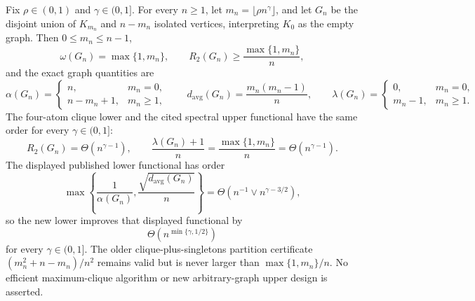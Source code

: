 Fix \(\rho\in(0,1)\) and \(\gamma\in(0,1]\).  For every \(n\geq1\), let \(m_n=\lfloor\rho n^{\gamma}\rfloor\), and let \(G_n\) be the disjoint union of \(K_{m_n}\) and \(n-m_n\) isolated vertices, interpreting \(K_0\) as the empty graph.  Then \(0\leq m_n\leq n-1\),
\[
\omega(G_n)=\max\{1,m_n\},
\qquad
R_2(G_n)\geq\frac{\max\{1,m_n\}}n,
\]
and the exact graph quantities are
\[
\alpha(G_n)=
\begin{cases}
n,&m_n=0,\\
n-m_n+1,&m_n\geq1,
\end{cases}
\qquad
d_{\mathrm{avg}}(G_n)=\frac{m_n(m_n-1)}n,
\qquad
\lambda(G_n)=
\begin{cases}
0,&m_n=0,\\
m_n-1,&m_n\geq1.
\end{cases}
\]
The four-atom clique lower and the cited spectral upper functional have the same order for every \(\gamma\in(0,1]\):
\[
R_2(G_n)=\Theta(n^{\gamma-1}),
\qquad
\frac{\lambda(G_n)+1}{n}
=\frac{\max\{1,m_n\}}n
=\Theta(n^{\gamma-1}).
\]
The displayed published lower functional has order
\[
\max\left\{\frac1{\alpha(G_n)},
\frac{\sqrt{d_{\mathrm{avg}}(G_n)}}n\right\}
=\Theta\!\left(n^{-1}\vee n^{\gamma-3/2}\right),
\]
so the new lower improves that displayed functional by
\[
\Theta\!\left(n^{\min\{\gamma,1/2\}}\right)
\]
for every \(\gamma\in(0,1]\).  The older clique-plus-singletons partition certificate \((m_n^2+n-m_n)/n^2\) remains valid but is never larger than \(\max\{1,m_n\}/n\).  No efficient maximum-clique algorithm or new arbitrary-graph upper design is asserted.